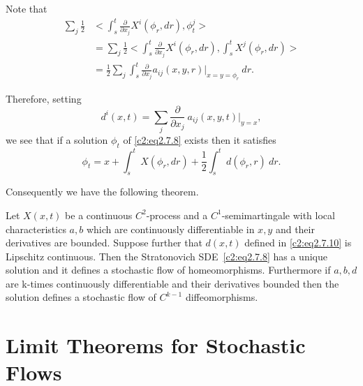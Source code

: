 Note that 
\begin{align*}
  \sum_j \frac{1}{2} & < \int^t_s \frac{\partial}{\partial x_j} X^i
  (\phi_r,dr),\phi^j_t >\\ 
  & = \sum_j \frac{1}{2} < \int^t_s
  \frac{\partial}{\partial x_j}  X^i (\phi_r,dr),\int^t_s X^j
  (\phi_r,dr) >\\ 
  & = \frac{1}{2} \sum_j \int^t_s \frac{\partial}{\partial x_j} a_{ij}
  (x,y,r) |_{x=y=\phi_r} ~ dr. 
\end{align*}

Therefore, setting
\begin{equation*}
  d^i(x,t) = \sum_j \frac{\partial}{\partial x_j} ~
  a_{ij}(x,y,t)|_{y=x},\tag{2.7.10}\label{c2:eq2.7.10} 
\end{equation*} 
we see that if a solution $\phi_t$ of \eqref{c2:eq2.7.8} exists then it satisfies
\begin{equation*}
  \phi_t = x + \int^t_s ~ X(\phi_r,dr) + \frac{1}{2} \int^t_s ~
  d(\phi_r,r) ~ dr.\tag{2.7.11}\label{c2:eq2.7.11} 
\end{equation*}

Consequently we have the following theorem.


\begin{theorem}\label{c2:thm2.7.7}%
  Let $X(x,t)$ be a continuous $C^2$-process and a
  $C^1$-semi\-martingale with local characteristics $a,b$ which are
  continuously differentiable in $x,y$ and their derivatives are
  bounded. Suppose further that $d(x,t)$ defined in \eqref{c2:eq2.7.10} is
  Lipschitz continuous. Then the Stratonovich SDE~\eqref{c2:eq2.7.8} has a
  unique solution and it defines a stochastic flow of
  homeomorphisms. Furthermore if $a,b,d$ are k-times continuously
  differentiable and their derivatives bounded then the solution
  defines a stochastic flow of $C^{k-1}$ diffeomorphisms. 
\end{theorem}



\chapter{Limit Theorems for Stochastic Flows}\label{chap3}%


